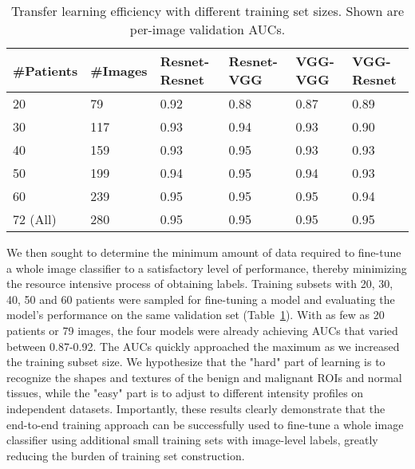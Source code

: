 \documentclass[12pt,letterpaper]{article}
\begin{document}
\begin{table}
\centering
\caption{Transfer learning efficiency with different training set sizes. Shown are per-image validation AUCs.}
\label{tab:transfer_eff}
\begin{tabular}{@{}llllll@{}}
\toprule
\textbf{\#Patients} & \textbf{\#Images} & \textbf{Resnet-Resnet} & \textbf{Resnet-VGG} & \textbf{VGG-VGG} & \textbf{VGG-Resnet} \\ \midrule
20 & 79 & 0.92 & 0.88 & 0.87 & 0.89 \\
30 & 117 & 0.93 & 0.94 & 0.93 & 0.90 \\
40 & 159 & 0.93 & 0.95 & 0.93 & 0.93 \\
50 & 199 & 0.94 & 0.95 & 0.94 & 0.93 \\
60 & 239 & 0.95 & 0.95 & 0.95 & 0.94 \\
72 (All) & 280 & 0.95 & 0.95 & 0.95 & 0.95 \\ \bottomrule
\end{tabular}
\end{table}


We then sought to determine the minimum amount of data required to fine-tune a whole image classifier to a satisfactory level of performance, thereby minimizing the resource intensive process of obtaining labels. Training subsets with 20, 30, 40, 50 and 60 patients were sampled for fine-tuning a model and evaluating the model's performance on the same validation set (Table~\ref{tab:transfer_eff}). With as few as 20 patients or 79 images, the four models were already achieving AUCs that varied between 0.87-0.92. The AUCs quickly approached the maximum as we increased the training subset size. We hypothesize that the "hard" part of learning is to recognize the shapes and textures of the benign and malignant ROIs and normal tissues, while the "easy" part is to adjust to different intensity profiles on independent datasets. Importantly, these results clearly demonstrate that the end-to-end training approach can be successfully used to fine-tune a whole image classifier using additional small training sets with image-level labels, greatly reducing the burden of training set construction.
\end{document}
